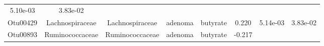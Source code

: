 \documentclass[11pt,]{article}
\begin{document}
\begin{longtable}[]{@{}cccccccc@{}}
\begin{minipage}[t]{0.08\columnwidth}
5.10e-03\strut
\end{minipage} & \begin{minipage}[t]{0.08\columnwidth}\centering\strut
3.83e-02\strut
\end{minipage}\tabularnewline
\begin{minipage}[t]{0.08\columnwidth}\centering\strut
Otu00429\strut
\end{minipage} & \begin{minipage}[t]{0.15\columnwidth}\centering\strut
Lachnospiraceae\strut
\end{minipage} & \begin{minipage}[t]{0.15\columnwidth}\centering\strut
Lachnospiraceae\strut
\end{minipage} & \begin{minipage}[t]{0.08\columnwidth}\centering\strut
adenoma\strut
\end{minipage} & \begin{minipage}[t]{0.09\columnwidth}\centering\strut
butyrate\strut
\end{minipage} & \begin{minipage}[t]{0.07\columnwidth}\centering\strut
0.220\strut
\end{minipage} & \begin{minipage}[t]{0.08\columnwidth}\centering\strut
5.14e-03\strut
\end{minipage} & \begin{minipage}[t]{0.08\columnwidth}\centering\strut
3.83e-02\strut
\end{minipage}\tabularnewline
\begin{minipage}[t]{0.08\columnwidth}\centering\strut
Otu00893\strut
\end{minipage} & \begin{minipage}[t]{0.15\columnwidth}\centering\strut
Ruminococcaceae\strut
\end{minipage} & \begin{minipage}[t]{0.15\columnwidth}\centering\strut
Ruminococcaceae\strut
\end{minipage} & \begin{minipage}[t]{0.08\columnwidth}\centering\strut
adenoma\strut
\end{minipage} & \begin{minipage}[t]{0.09\columnwidth}\centering\strut
butyrate\strut
\end{minipage} & \begin{minipage}[t]{0.07\columnwidth}\centering\strut
-0.217\strut
\end{minipage} & \begin{minipage}[t]{0.08\columnwidth}\centering\strut

\end{minipage}
\end{longtable}
\end{document}
